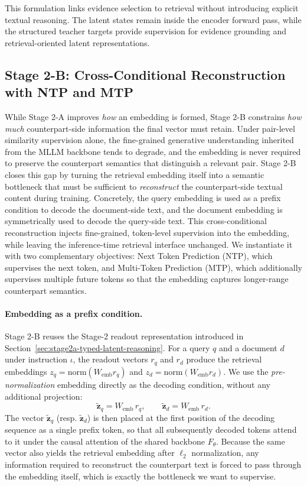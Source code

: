 This formulation links evidence selection to retrieval without introducing explicit textual reasoning. The latent states remain inside the encoder forward pass, while the structured teacher targets provide supervision for evidence grounding and retrieval-oriented latent representations.


\subsection{Stage 2-B: Cross-Conditional Reconstruction with NTP and MTP}
\label{sec:stage2b-cross-conditional-self-decoding}


While Stage 2-A improves \emph{how} an embedding is formed, Stage 2-B constrains \emph{how much} counterpart-side information the final vector must retain. Under pair-level similarity supervision alone, the fine-grained generative understanding inherited from the MLLM backbone tends to degrade, and the embedding is never required to preserve the counterpart semantics that distinguish a relevant pair. Stage 2-B closes this gap by turning the retrieval embedding itself into a semantic bottleneck that must be sufficient to \emph{reconstruct} the counterpart-side textual content during training. Concretely, the query embedding is used as a prefix condition to decode the document-side text, and the document embedding is symmetrically used to decode the query-side text. This cross-conditional reconstruction injects fine-grained, token-level supervision into the embedding, while leaving the inference-time retrieval interface unchanged. We instantiate it with two complementary objectives: Next Token Prediction (NTP), which supervises the next token, and Multi-Token Prediction (MTP), which additionally supervises multiple future tokens so that the embedding captures longer-range counterpart semantics.

\paragraph{Embedding as a prefix condition.}
Stage 2-B reuses the Stage-2 readout representation introduced in Section~\ref{sec:stage2a-typed-latent-reasoning}. For a query $q$ and a document $d$ under instruction $\iota$, the readout vectors $r_q$ and $r_d$ produce the retrieval embeddings $z_q=\mathrm{norm}(W_{\text{emb}}r_q)$ and $z_d=\mathrm{norm}(W_{\text{emb}}r_d)$. We use the \emph{pre-normalization} embedding directly as the decoding condition, without any additional projection:
\begin{equation}
\tilde{\mathbf{z}}_q = W_{\text{emb}}\,r_q,
\qquad
\tilde{\mathbf{z}}_d = W_{\text{emb}}\,r_d .
\label{eq:s2b-prefix}
\end{equation}
The vector $\tilde{\mathbf{z}}_q$ (resp. $\tilde{\mathbf{z}}_d$) is then placed at the first position of the decoding sequence as a single prefix token, so that all subsequently decoded tokens attend to it under the causal attention of the shared backbone $F_\theta$. Because the same vector also yields the retrieval embedding after $\ell_2$ normalization, any information required to reconstruct the counterpart text is forced to pass through the embedding itself, which is exactly the bottleneck we want to supervise.

